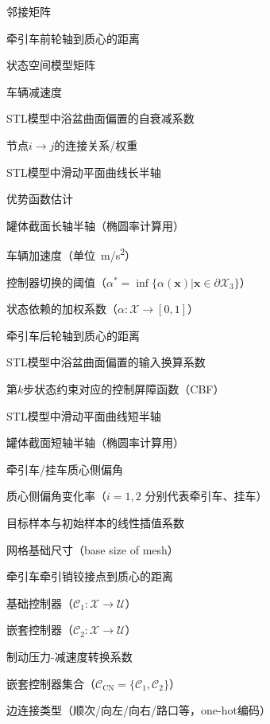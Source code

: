\begin{denotation}[3cm]
  \item[{$\mathcal{A}$}] 邻接矩阵
  \item[$a$] 牵引车前轮轴到质心的距离
  \item[{$A,B,C,D$}] 状态空间模型矩阵
  \item[$a_{deccel}$] 车辆减速度
  \item[$a_{dev}$] STL模型中浴盆曲面偏置的自衰减系数
  \item[{$a_{ij}$}] 节点$i\rightarrow j$的连接关系/权重
  \item[$a_p$] STL模型中滑动平面曲线长半轴
  \item[{$\hat{A}_t$}] 优势函数估计
  \item[{$a_t$}] 罐体截面长轴半轴（椭圆率计算用）
  \item[{$a_{veh}$}] 车辆加速度（单位\SI{}{m/s^2}）
  \item[{$\alpha^*$}] 控制器切换的阈值（$\alpha^* = \inf\{\alpha(\bm{x}) | \bm{x} \in \partial \mathcal{X}_3\}$）
  \item[{$\alpha(\bm{x})$}] 状态依赖的加权系数（$\alpha: \mathcal{X} \to [0,1]$）
  \item[$b$] 牵引车后轮轴到质心的距离
  \item[$b_{dev}$] STL模型中浴盆曲面偏置的输入换算系数
  \item[{$b_k^x$}] 第$k$步状态约束对应的控制屏障函数（CBF）
  \item[$b_p$] STL模型中滑动平面曲线短半轴
  \item[{$b_t$}] 罐体截面短轴半轴（椭圆率计算用）
  \item[{$\beta_1,\beta_2$}] 牵引车/挂车质心侧偏角
  \item[{$\dot{\beta_i}$}] 质心侧偏角变化率（$i=1,2$ 分别代表牵引车、挂车）
  \item[{$\beta_t$}] 目标样本与初始样本的线性插值系数
  \item[{$\text{bs}$}] 网格基础尺寸（base size of mesh）
  \item[$c$] 牵引车牵引销铰接点到质心的距离
  \item[{$\mathcal{C}_1$}] 基础控制器（$\mathcal{C}_1: \mathcal{X} \to \mathcal{U}$）
  \item[{$\mathcal{C}_2$}] 嵌套控制器（$\mathcal{C}_2: \mathcal{X} \to \mathcal{U}$）
  \item[$c_{brk}$] 制动压力-减速度转换系数
  \item[{$\mathcal{C}_{\text{CN}}$}] 嵌套控制器集合（$\mathcal{C}_{\text{CN}} = \{\mathcal{C}_1, \mathcal{C}_2\}$）
  \item[{$c_{con}$}] 边连接类型（顺次/向左/向右/路口等，one-hot编码）

\end{denotation}
